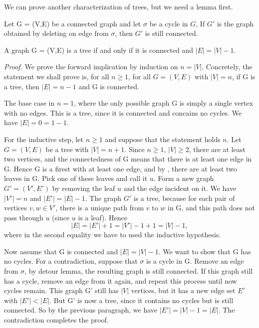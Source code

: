 \documentclass{tufte-handout}
\begin{document}
We can prove another characterization of trees, but we need a lemma first.

\begin{Lemma}
    Let G = (V,E) be a connected graph and let \(\sigma\) be a cycle in \( G \),
    If \( G' \) is the graph obtained by deleting on edge from \(\sigma\), then \( G' \) is still connected.
\end{Lemma}

\begin{Lemma}
    A graph G = (V,E) is a tree if and only if it is connected and \(\left|E\right| = \left|V\right|-1\).
\end{Lemma}

\textit{Proof.} We prove the forward implication by induction on \( n = \left|V\right| \).
Concretely, the statement we shall prove is, for all \(n \geq 1\), for all \(G = (V,E)\) with \(\left|V\right| = n\),
if G is a tree, then \(\left|E\right| = n-1\) and G is connected.

The base case in \( n=1 \), where the only possible graph G is simply a single vertex with no edges.
This is a tree, since it is connected and concains no cycles. We have \(\left|E\right| = 0 = 1-1\).

For the inductive step, let \( n \geq 1 \) and suppose that the statement holds \( n \). Let
\( G = (V,E) \) be a tree with \(\left|V\right| = n+1\). Since \( n\geq 1  \), \( \left|V\right| \geq 2 \),
there are at least two vertices, and the connectedness of G means that there is at least one edge in G.
Hence G is a firest with at least one edge, and by , there are at least two
leaves in G. Pick one of these leaves and call it \( u \). Form a new graph \( G' = (V',E') \) by removing
the leaf \( u \) and the edge incident on it. We have \(\left|V'\right| = n\) and \(\left|E'\right| = \left|E\right|-1\).
The graph \( G' \) is a tree, because for each pair of vertices \( v,w \in V' \), there is a unique path from \( v \) to \( w \)
in G, and this path does not pass through \( u \) (since \( u \) is a leaf). Hence
\[ \left|E\right| = \left|E'\right| + 1 = \left|V'\right| - 1 + 1 = \left|V\right| - 1, \]
where in the second equality we have to used the inductive hypothesis. 

Now assume that G is connected and \(\left|E\right| = \left|V\right| - 1\). We want to show
that G has no cycles. For a contradiction, suppose that \(\sigma\) is a cycle in G. 
Remove an edge from \(\sigma\), by detour lemma, the resulting graph is still connected.
If this graph still has a cycle, remove an edge from it again, and repeat this process until now cycles remain.
This graph G' still has \(\left|V\right|\) vertices, but it has a new edge set \( E' \) with \(\left|E'\right| < \left|E\right|\).
But G' is now a tree, since it contains no cycles but is still connected. So by the
previous paragraph, we have \(\left|E'\right| = \left|V\right| - 1 = \left|E\right|\).
The contradiction completes the proof. \qedsymbol
\end{document}
